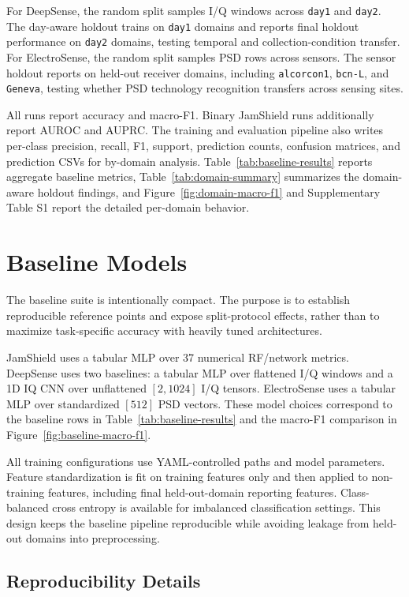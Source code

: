 \documentclass{ieeeaccess}
\newcommand{\artifact}[1]{\texttt{#1}}
\begin{document}
For DeepSense, the random split samples I/Q windows across \artifact{day1} and \artifact{day2}. The day-aware holdout trains on \artifact{day1} domains and reports final holdout performance on \artifact{day2} domains, testing temporal and collection-condition transfer. For ElectroSense, the random split samples PSD rows across sensors. The sensor holdout reports on held-out receiver domains, including \artifact{alcorcon1}, \artifact{bcn-L}, and \artifact{Geneva}, testing whether PSD technology recognition transfers across sensing sites.

All runs report accuracy and macro-F1. Binary JamShield runs additionally report AUROC and AUPRC. The training and evaluation pipeline also writes per-class precision, recall, F1, support, prediction counts, confusion matrices, and prediction CSVs for by-domain analysis. Table~\ref{tab:baseline-results} reports aggregate baseline metrics, Table~\ref{tab:domain-summary} summarizes the domain-aware holdout findings, and Figure~\ref{fig:domain-macro-f1} and Supplementary Table S1 report the detailed per-domain behavior.

\section{Baseline Models}

The baseline suite is intentionally compact. The purpose is to establish reproducible reference points and expose split-protocol effects, rather than to maximize task-specific accuracy with heavily tuned architectures.

JamShield uses a tabular MLP over 37 numerical RF/network metrics. DeepSense uses two baselines: a tabular MLP over flattened I/Q windows and a 1D IQ CNN over unflattened $[2, 1024]$ I/Q tensors. ElectroSense uses a tabular MLP over standardized $[512]$ PSD vectors. These model choices correspond to the baseline rows in Table~\ref{tab:baseline-results} and the macro-F1 comparison in Figure~\ref{fig:baseline-macro-f1}.

All training configurations use YAML-controlled paths and model parameters. Feature standardization is fit on training features only and then applied to non-training features, including final held-out-domain reporting features. Class-balanced cross entropy is available for imbalanced classification settings. This design keeps the baseline pipeline reproducible while avoiding leakage from held-out domains into preprocessing.

\subsection{Reproducibility Details}
\end{document}
